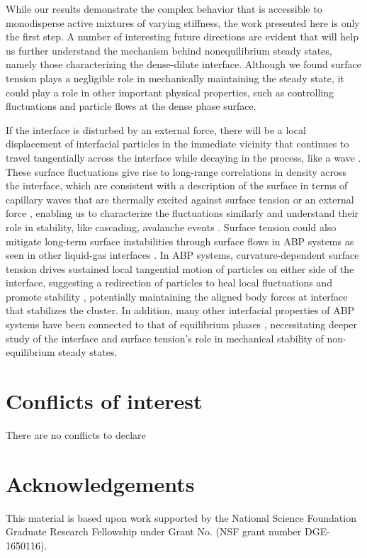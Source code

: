\documentclass[twoside,twocolumn,9pt]{article}
\begin{document}
While our results demonstrate the complex behavior that is accessible to monodisperse active mixtures of varying stiffness, the work presented here is only the first step. A number of interesting future directions are evident that will help us further understand the mechanism behind nonequilibrium steady states, namely those characterizing the dense-dilute interface. Although we found surface tension plays a negligible role in mechanically maintaining the steady state, it could play a role in other important physical properties, such as controlling fluctuations and particle flows at the dense phase surface. 

If the interface is disturbed by an external force, there will be a local displacement of interfacial particles in the immediate vicinity that continues to travel tangentially across the interface while decaying in the process, like a wave \cite{Wertheim1976}. These surface fluctuations give rise to long-range correlations in density across the interface, which are consistent with a description of the surface in terms of capillary waves that are thermally excited against surface tension or an external force \cite{Evans1979}, enabling us to characterize the fluctuations similarly \cite{Wysocki2016} and understand their role in stability, like cascading, avalanche events \cite{Redner2013, Stenhammar2015}. Surface tension could also mitigate long-term surface instabilities through surface flows in ABP systems as seen in other liquid-gas interfaces \cite{Keller1983}. In ABP systems, curvature-dependent surface tension drives sustained local tangential motion of particles on either side of the interface, suggesting a redirection of particles to heal local fluctuations and promote stability \cite{Patch2018}, potentially maintaining the aligned body forces at interface that stabilizes the cluster. In addition, many other interfacial properties of ABP systems have been connected to that of equilibrium phases \cite{MariniBettoloMarconi2016, Speck2016, Prymidis2016, Lee2017, Solon2018, Tjhung2018}, necessitating deeper study of the interface and surface tension's role in mechanical stability of non-equilibrium steady states.

\section*{Conflicts of interest}
There are no conflicts to declare

\section*{Acknowledgements}
This material is based upon work supported by the National Science Foundation Graduate Research Fellowship under Grant No. (NSF grant number DGE-1650116).
\end{document}
